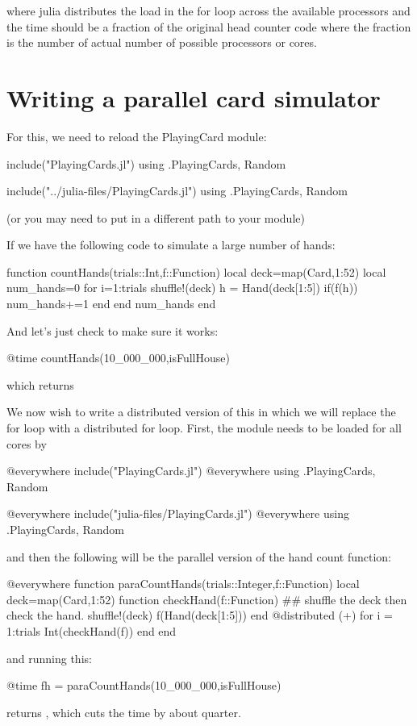 where julia distributes the load in the for loop across the available
processors and the time should be a fraction of the original head counter code
where the fraction is the number of actual number of possible processors
or cores.

\section{Writing a parallel card simulator}

For this, we need to reload the PlayingCard module:
%
\begin{jlverbatim}[parallel]
include("PlayingCards.jl")
using .PlayingCards, Random
\end{jlverbatim}
\begin{jlcode}[parallel]
include("../julia-files/PlayingCards.jl")
using .PlayingCards, Random
\end{jlcode}

(or you may need to put in a different path to your module)

If we have the following code to simulate a large number of hands:

\begin{jlblock}[parallel]
function countHands(trials::Int,f::Function)
    local deck=map(Card,1:52)
    local num_hands=0
    for i=1:trials
        shuffle!(deck)
        h = Hand(deck[1:5])
        if(f(h))
            num_hands+=1
        end
    end
    num_hands
end
\end{jlblock}

And let's just check to make sure it works:

\begin{jlblock}[parallel]
@time countHands(10_000_000,isFullHouse)
\end{jlblock} 
which returns  
\printpythontex[verbatim]


We now wish to write a distributed version of this in which we will
replace the for loop with a distributed for loop.  First, the module needs to be loaded for all cores by
\begin{jlverbatim}
@everywhere include("PlayingCards.jl")
@everywhere using .PlayingCards, Random
\end{jlverbatim}
\begin{jlcode}[parallel]
@everywhere include("julia-files/PlayingCards.jl")
@everywhere using .PlayingCards, Random
\end{jlcode}
%
and then the following will be the parallel version of the hand count function:
%
%
\begin{jlblock}[parallel]
@everywhere function paraCountHands(trials::Integer,f::Function)
  local deck=map(Card,1:52)
  function checkHand(f::Function) ## shuffle the deck then check the hand.
    shuffle!(deck)
    f(Hand(deck[1:5]))
  end
  @distributed (+) for i = 1:trials
    Int(checkHand(f))
  end  
end
\end{jlblock}
%
and running this:
%
\begin{jlblock}[parallel]
@time fh = paraCountHands(10_000_000,isFullHouse)
\end{jlblock}
returns \printpythontex[verbatim], which cuts the time by about quarter.

